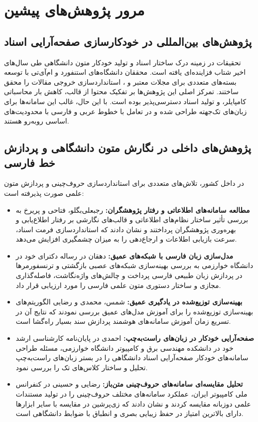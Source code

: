 \section{مرور پژوهش‌های پیشین}
\label{sec:ch2_related_works}

\subsection{پژوهش‌های بین‌المللی در خودکارسازی صفحه‌آرایی اسناد}
تحقیقات در زمینه درک ساختار اسناد و تولید خودکار متون دانشگاهی طی سال‌های اخیر شتاب فزاینده‌ای یافته است. محققان دانشگاه‌های استنفورد و ام‌آی‌تی با توسعه بسته‌های متعددی برای مجلات معتبر  و ، استانداردسازی خروجی مقالات را محقق ساختند. تمرکز اصلی این پژوهش‌ها بر تفکیک محتوا از قالب، کاهش بار محاسباتی کامپایلر، و تولید اسناد دسترسی‌پذیر بوده است. با این حال، غالب این سامانه‌ها برای زبان‌های تک‌جهته طراحی شده و در تعامل با خطوط عربی و فارسی با محدودیت‌های اساسی روبه‌رو هستند.

\subsection{پژوهش‌های داخلی در نگارش متون دانشگاهی و پردازش خط فارسی}
در داخل کشور، تلاش‌های متعددی برای استانداردسازی حروف‌چینی و پردازش متون علمی صورت پذیرفته است:
\begin{itemize}
  \item \textbf{مطالعه سامانه‌های اطلاعاتی و رفتار پژوهشگران:} رجبعلی‌بگلو، فتاحی و پریرخ \cite{fatahi1395} به بررسی تأثیر ساختار نظام‌های اطلاعاتی و قالب‌های نگارشی بر رفتار اطلاع‌یابی و بهره‌وری پژوهشگران پرداختند و نشان دادند که استانداردسازی فرمت اسناد، سرعت بازیابی اطلاعات و ارجاع‌دهی را به میزان چشمگیری افزایش می‌دهد.
  \item \textbf{مدل‌سازی زبان فارسی با شبکه‌های عمیق:} دهقان \cite{dehghan1399phd} در رساله دکترای خود در دانشگاه خوارزمی به بررسی بهینه‌سازی شبکه‌های عصبی بازگشتی و ترنسفورمرها در پردازش زبان طبیعی فارسی پرداخت و چالش‌های واژه‌نگاشت، فاصله‌گذاری مجازی و ساختار دستوری متون علمی فارسی را مورد ارزیابی قرار داد.
  \item \textbf{بهینه‌سازی توزیع‌شده در یادگیری عمیق:} شمس، محمدی و رضایی \cite{shams1401} الگوریتم‌های بهینه‌سازی توزیع‌شده را برای آموزش مدل‌های عمیق بررسی نمودند که نتایج آن در تسریع زمان آموزش سامانه‌های هوشمند پردازش سند بسیار راه‌گشا است.
  \item \textbf{صفحه‌آرایی خودکار در زبان‌های راست‌به‌چپ:} احمدی \cite{ahmadi1401thesis} در پایان‌نامه کارشناسی ارشد خود در دانشکده مهندسی برق و کامپیوتر دانشگاه خوارزمی، مسئله طراحی سامانه‌های خودکار صفحه‌آرایی اسناد دانشگاهی را در بستر زبان‌های راست‌به‌چپ تحلیل و ساختار کلاس‌های تک را بررسی نمود.
  \item \textbf{تحلیل مقایسه‌ای سامانه‌های حروف‌چینی متن‌باز:} رضایی و حسینی \cite{rezaei1402} در کنفرانس ملی کامپیوتر ایران، عملکرد سامانه‌های مختلف حروف‌چینی را در تولید مستندات علمی دوزبانه مقایسه کردند و نشان دادند که زی‌پرشین در مقایسه با سایر ابزارها دارای بالاترین امتیاز در حفظ زیبایی بصری و انطباق با ضوابط دانشگاهی است.
\end{itemize}

